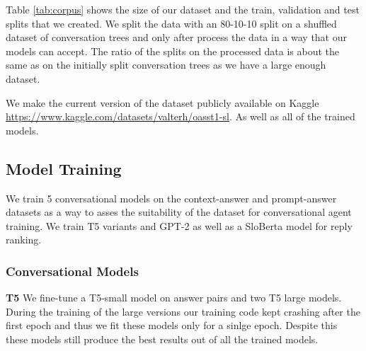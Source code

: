 \documentclass[fleqn,moreauthors,10pt]{ds_report}
\begin{document}
    Table \ref{tab:corpus} shows the size of our dataset and the train, validation and test splits that we created.
    We split the data with an 80-10-10 split on a shuffled dataset of conversation trees and only after process the data in a way that our models can accept.
    The ratio of the splits on the processed data is about the same as on the initially split conversation trees as we have a large enough dataset.
    

    \begin{table}[!h]
        \centering
       \caption{\textbf{Corpus Description}: This table shows the size and composition of the dataset used to train and evaluate our conversational agent.}
       \label{tab:corpus}
    \end{table}

    We make the current version of the dataset publicly available on Kaggle \url{https://www.kaggle.com/datasets/valterh/oasst1-sl}. As well as all of the trained models.

    \subsection*{Model Training}
    We train 5 conversational models on the context-answer and prompt-answer datasets as a way to asses the suitability of the dataset for conversational agent training. 
    We train T5 variants and GPT-2 as well as a SloBerta model for reply ranking.
    \subsubsection*{Conversational Models}
    \noindent\textbf{T5} We fine-tune a T5-small model on answer pairs and two T5 large models. During the training of the large versions our training code kept crashing after the first epoch and thus we fit these models only for a sinlge epoch. Despite this these models still produce the best results out of all the trained models.
    
\end{document}

